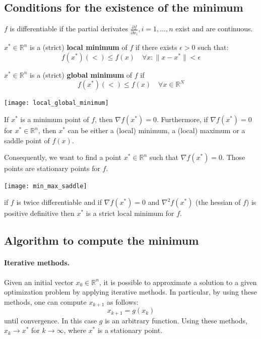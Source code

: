 \documentclass{article}
\begin{document}
\subsection{Conditions for the existence of the minimum} 
\begin{definition}
    $f$ is differentiable if the partial derivates
    $\frac{\partial{f}}{\partial{x_i}},i=1,\ldots,n$ exist and are continuous. 
\end{definition}
\begin{definition}
    $x^*\in \mathbb{R}^n$ is a (strict) \textbf{local minimum} of $f$ if there
    exists $\epsilon>0$ such that:
    $$f(x^*)(<)\leq f(x)\quad \forall x: \lVert x-x^*\rVert<\epsilon$$
\end{definition}
\begin{definition}
    $x^*\in \mathbb{R}^n$ is a (strict) \textbf{global minimum} of $f$ if 
    $$f(x^*)(<)\leq f(x)\quad \forall x\in\mathbb{R}^N$$
\end{definition}
\begin{center}
    \texttt{[image: local\_global\_minimum]}
\end{center}
\begin{definition}
    If $x^*$ is a minimum point of $f$, then $\nabla f(x^*)=0$. Furthermore,
    if $\nabla f(x^*)=0$ for $x^*\in \mathbb{R}^n$, then $x^*$ can be either a
    (local) minimum, a (local) maximum or a saddle point of $f(x)$.
\end{definition}
Consequently, we want to find a point $x^*\in \mathbb{R}^n$ such that $\nabla
f(x^*)=0$. Those points are stationary points for $f$.
\begin{center}
    \texttt{[image: min\_max\_saddle]}
\end{center}
\begin{definition}
    if $f$ is twice differentiable and if $\nabla f(x^*)=0$ and
    $\nabla^2f(x^*)$ (the hessian of $f$) is positive definitive then $x^*$ is
    a strict local minimum for $f$.
\end{definition}
\subsection{Algorithm to compute the minimum}
\paragraph{Iterative methods.} Given an initial vector $x_0\in \mathbb{R}^n$,
it is possible to approximate a solution to a given optimization problem by
applying iterative methods. In particular, by using these methods, one can
compute $x_{k+1}$ as follows:
$$x_{k+1}=g(x_k)$$
until convergence. In this case $g$ is an arbitrary function. Using these
methods, $x_k\to x^*$ for $k\to\infty$, where $x^*$ is a stationary point.
\end{document}

